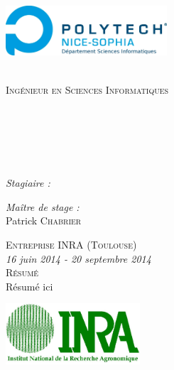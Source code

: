 \begin{titlepage}
\begin{center}
\begin{minipage}[t]{0.49\textwidth}
\begin{flushleft}
  \end{flushleft}
\end{minipage} 
\begin{minipage}[t]{0.49\textwidth}
  \begin{flushright}
    \includegraphics [width=60mm]{images/Logo_polytech_SI.jpg} \\[0.2cm]
  \end{flushright}
\end{minipage} \\[2.0cm]
\vspace*{-0.8cm}
\textsc{\Large Ingénieur en Sciences Informatiques}\\[0.5cm]
\textsc{\Large \reportsubject}\\[0.5cm]
\HRule \\[0.4cm]
{\huge \bfseries \reporttitle}\\[0.4cm]
{\Large \bfseries \reportsubtitle}\\[0.2cm]
\HRule \\[1.5cm]
\vspace*{-0.8cm}
\begin{minipage}[t]{0.64\textwidth}
  \begin{flushleft} \large
    \emph{Stagiaire :}\\
    \reportauthor
  \end{flushleft}
\end{minipage}
\begin{minipage}[t]{0.35\textwidth}
  \begin{flushleft} \large
    \emph{Maître de stage :} \\
    Patrick \textsc{Chabrier}
  \end{flushleft}
  \vspace*{1.0cm}
\end{minipage}
\textsc{\Large Entreprise INRA (Toulouse)}\\[0.5cm]
{\emph{16 juin 2014 - 20 septembre 2014}}\\
\vspace*{0.8cm}
\textsc{\Large Résumé}\\[0.5cm]
\justify
Résumé ici
\vfill

\center
\vspace*{0.3cm}
\includegraphics [width=50mm]{images/logoINRA.jpg} \\[0.6cm]
\end{center}

\end{titlepage}
